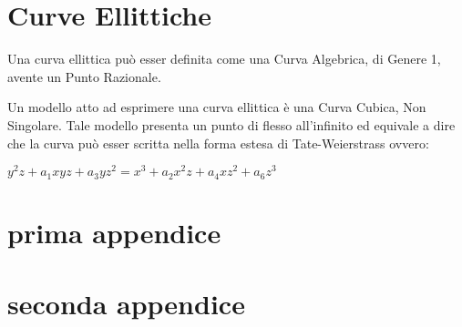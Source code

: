 \documentclass[a4paper,12pt]{tesiinfo}
\begin{document}
\chapter{Curve Ellittiche}

Una curva ellittica pu\`o esser definita come una Curva Algebrica, di Genere 1, avente un Punto Razionale.

Un modello atto ad esprimere una curva ellittica \`e una Curva Cubica, Non Singolare. Tale modello presenta un punto di flesso all'infinito ed equivale a dire che la curva pu\`o esser scritta nella forma estesa di Tate-Weierstrass ovvero:

$y^{2}z + a_1xyz + a_3yz^2 =x^3 + a_2x^2z + a_4xz^2 + a_6z^3$




\appendice
\chapter{prima appendice}
\chapter{seconda appendice}
\end{document}
